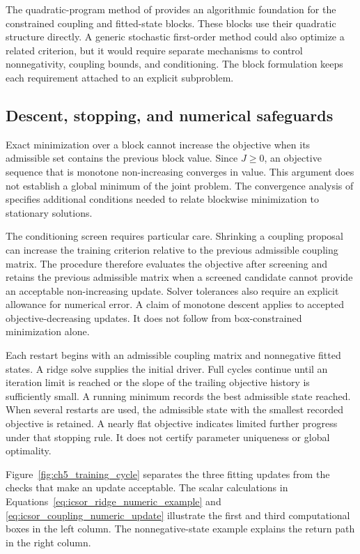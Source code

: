 The quadratic-program method of \citet{Stellato2018} provides an algorithmic foundation for the constrained coupling and fitted-state blocks. These blocks use their quadratic structure directly. A generic stochastic first-order method could also optimize a related criterion, but it would require separate mechanisms to control nonnegativity, coupling bounds, and conditioning. The block formulation keeps each requirement attached to an explicit subproblem.

\subsection{Descent, stopping, and numerical safeguards}

Exact minimization over a block cannot increase the objective when its admissible set contains the previous block value. Since \(J\geq0\), an objective sequence that is monotone non-increasing converges in value. This argument does not establish a global minimum of the joint problem. The convergence analysis of \citet{Razaviyayn2013} specifies additional conditions needed to relate blockwise minimization to stationary solutions.

The conditioning screen requires particular care. Shrinking a coupling proposal can increase the training criterion relative to the previous admissible coupling matrix. The procedure therefore evaluates the objective after screening and retains the previous admissible matrix when a screened candidate cannot provide an acceptable non-increasing update. Solver tolerances also require an explicit allowance for numerical error. A claim of monotone descent applies to accepted objective-decreasing updates. It does not follow from box-constrained minimization alone.

Each restart begins with an admissible coupling matrix and nonnegative fitted states. A ridge solve supplies the initial driver. Full cycles continue until an iteration limit is reached or the slope of the trailing objective history is sufficiently small. A running minimum records the best admissible state reached. When several restarts are used, the admissible state with the smallest recorded objective is retained. A nearly flat objective indicates limited further progress under that stopping rule. It does not certify parameter uniqueness or global optimality.

Figure~\ref{fig:ch5_training_cycle} separates the three fitting updates from the checks that make an update acceptable. The scalar calculations in Equations~\eqref{eq:icsor_ridge_numeric_example} and \eqref{eq:icsor_coupling_numeric_update} illustrate the first and third computational boxes in the left column. The nonnegative-state example explains the return path in the right column.

